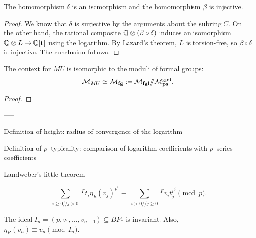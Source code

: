 \begin{theorem}
The homomorphism $\delta$ is an isomorphism and the homomorphism $\beta$ is injective.
\end{theorem}
\begin{proof}
We know that $\delta$ is surjective by the arguments about the subring $C$.  On the other hand, the rational composite $\mathbb{Q} \otimes (\beta \circ \delta)$ induces an isomorphism $\mathbb{Q} \otimes L \to \mathbb{Q}[\mathbf t]$ using the logarithm.  By Lazard's theorem, $L$ is torsion-free, so $\beta \circ \delta$ is injective.  The conclusion follows.
\end{proof}

\begin{remark}
\end{remark}


\begin{corollary}
The context for $MU$ is isomorphic to the moduli of formal groups: \[\mathcal{M}_{MU} \simeq \mathcal{M}_{\mathbf{fg}} := \mathcal{M}_{\mathbf{fgl}} /\!\!/ \mathcal{M}_{\mathbf{ps}}^{\mathrm{gpd}}.\]  
\end{corollary}
\begin{proof}
\end{proof}


-----

Definition of height: radius of convergence of the logarithm

Definition of $p$--typicality: comparison of logarithm coefficients with $p$--series coefficients



Landweber's little theorem

\begin{lemma}
\[\sum_{\substack{i \ge 0 // j > 0}}{}^F t_i \eta_R(v_j)^{p^i} \equiv \sum_{\substack{i > 0 // j \ge 0}}{}^F v_i t_j^{p^i} \pmod p.\]
\end{lemma}

\begin{corollary}
The ideal $I_n = (p, v_1, \ldots, v_{n-1}) \subseteq BP_*$ is invariant.  Also, $\eta_R(v_n) \equiv v_n \pmod{I_n}$.
\end{corollary}

